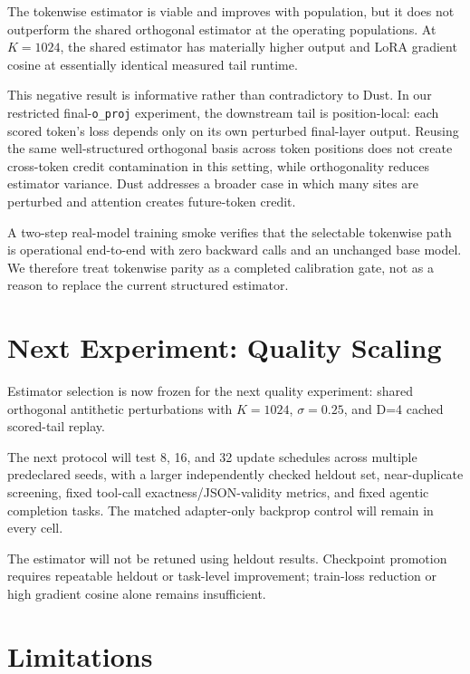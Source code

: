 \documentclass[11pt]{article}
\newcommand{\oproj}{\texttt{o\_proj}}
\begin{document}
The tokenwise estimator is viable and improves with population, but it does
not outperform the shared orthogonal estimator at the operating populations.
At $K=1024$, the shared estimator has materially higher output and LoRA
gradient cosine at essentially identical measured tail runtime.

This negative result is informative rather than contradictory to Dust. In our
restricted final-\oproj{} experiment, the downstream tail is position-local:
each scored token's loss depends only on its own perturbed final-layer output.
Reusing the same well-structured orthogonal basis across token positions does
not create cross-token credit contamination in this setting, while
orthogonality reduces estimator variance. Dust addresses a broader case in
which many sites are perturbed and attention creates future-token credit.

A two-step real-model training smoke verifies that the selectable tokenwise
path is operational end-to-end with zero backward calls and an unchanged base
model. We therefore treat tokenwise parity as a completed calibration gate,
not as a reason to replace the current structured estimator.

\section{Next Experiment: Quality Scaling}

Estimator selection is now frozen for the next quality experiment:
shared orthogonal antithetic perturbations with $K=1024$, $\sigma=0.25$, and
D=4 cached scored-tail replay.

The next protocol will test 8, 16, and 32 update schedules across multiple
predeclared seeds, with a larger independently checked heldout set,
near-duplicate screening, fixed tool-call exactness/JSON-validity metrics, and
fixed agentic completion tasks. The matched adapter-only backprop control will
remain in every cell.

The estimator will not be retuned using heldout results. Checkpoint promotion
requires repeatable heldout or task-level improvement; train-loss reduction or
high gradient cosine alone remains insufficient.

\section{Limitations}
\end{document}
